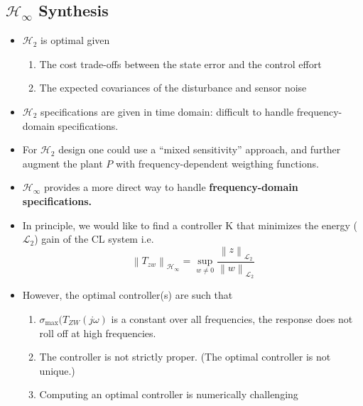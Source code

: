\subsection{\texorpdfstring{$\mathcal{H}_\infty$}{H-infinity} Synthesis}
\begin{itemize}
    \item $\mathcal{H}_2$ is optimal given
          \begin{enumerate}
              \item The cost trade-offs between the state error and the control effort
              \item The expected covariances of the disturbance and sensor noise
          \end{enumerate}
    \item $\mathcal{H}_2$ specifications are given in time domain: difficult to handle frequency-domain specifications.
    \item For $\mathcal{H}_2$ design one could use a “mixed sensitivity” approach, and further augment the plant $P$ with frequency-dependent weigthing functions.
    \item $\mathcal{H}_\infty$ provides a more direct way to handle \textbf{frequency-domain specifications.}
\end{itemize}

\begin{itemize}
    \item In principle, we would like to find a controller K that minimizes the energy ($\mathcal{L}_2$) gain of the CL system i.e.
          \begin{equation*}
              \left\|T_{zw}\right\|_{\mathcal{H}_\infty}=\sup_{w\neq0}\frac{\left\|z\right\|_{\mathcal{L}_2}}{\left\|w\right\|_{\mathcal{L}_2}}
          \end{equation*}
    \item However, the optimal controller(s) are such that
          \begin{enumerate}
              \item $\sigma_{\max}(T_{ZW}(j\omega)$ is a constant over all frequencies, the response does not roll off at high frequencies.
              \item The controller is not strictly proper. (The optimal controller is not unique.)
              \item Computing an optimal controller is numerically challenging
          \end{enumerate}
\end{itemize}


